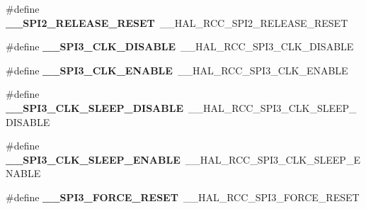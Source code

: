 \begin{DoxyCompactItemize}
\item 
\#define {\bfseries \+\_\+\+\_\+\+S\+P\+I2\+\_\+\+R\+E\+L\+E\+A\+S\+E\+\_\+\+R\+E\+S\+ET}~\+\_\+\+\_\+\+H\+A\+L\+\_\+\+R\+C\+C\+\_\+\+S\+P\+I2\+\_\+\+R\+E\+L\+E\+A\+S\+E\+\_\+\+R\+E\+S\+ET\hypertarget{group___h_a_l___r_c_c___aliased_ga92a086f3ba8dd0d3afe55ba477704051}{}\label{group___h_a_l___r_c_c___aliased_ga92a086f3ba8dd0d3afe55ba477704051}

\item 
\#define {\bfseries \+\_\+\+\_\+\+S\+P\+I3\+\_\+\+C\+L\+K\+\_\+\+D\+I\+S\+A\+B\+LE}~\+\_\+\+\_\+\+H\+A\+L\+\_\+\+R\+C\+C\+\_\+\+S\+P\+I3\+\_\+\+C\+L\+K\+\_\+\+D\+I\+S\+A\+B\+LE\hypertarget{group___h_a_l___r_c_c___aliased_ga28cdbd67b8d023f6c6d779ad764be780}{}\label{group___h_a_l___r_c_c___aliased_ga28cdbd67b8d023f6c6d779ad764be780}

\item 
\#define {\bfseries \+\_\+\+\_\+\+S\+P\+I3\+\_\+\+C\+L\+K\+\_\+\+E\+N\+A\+B\+LE}~\+\_\+\+\_\+\+H\+A\+L\+\_\+\+R\+C\+C\+\_\+\+S\+P\+I3\+\_\+\+C\+L\+K\+\_\+\+E\+N\+A\+B\+LE\hypertarget{group___h_a_l___r_c_c___aliased_gaa92d4898892ab4c0fba44fa0b6ac02b4}{}\label{group___h_a_l___r_c_c___aliased_gaa92d4898892ab4c0fba44fa0b6ac02b4}

\item 
\#define {\bfseries \+\_\+\+\_\+\+S\+P\+I3\+\_\+\+C\+L\+K\+\_\+\+S\+L\+E\+E\+P\+\_\+\+D\+I\+S\+A\+B\+LE}~\+\_\+\+\_\+\+H\+A\+L\+\_\+\+R\+C\+C\+\_\+\+S\+P\+I3\+\_\+\+C\+L\+K\+\_\+\+S\+L\+E\+E\+P\+\_\+\+D\+I\+S\+A\+B\+LE\hypertarget{group___h_a_l___r_c_c___aliased_ga7d9b001be65e2b904269e60f476643eb}{}\label{group___h_a_l___r_c_c___aliased_ga7d9b001be65e2b904269e60f476643eb}

\item 
\#define {\bfseries \+\_\+\+\_\+\+S\+P\+I3\+\_\+\+C\+L\+K\+\_\+\+S\+L\+E\+E\+P\+\_\+\+E\+N\+A\+B\+LE}~\+\_\+\+\_\+\+H\+A\+L\+\_\+\+R\+C\+C\+\_\+\+S\+P\+I3\+\_\+\+C\+L\+K\+\_\+\+S\+L\+E\+E\+P\+\_\+\+E\+N\+A\+B\+LE\hypertarget{group___h_a_l___r_c_c___aliased_gaef9852457424d2e92e6e1cb1366b8981}{}\label{group___h_a_l___r_c_c___aliased_gaef9852457424d2e92e6e1cb1366b8981}

\item 
\#define {\bfseries \+\_\+\+\_\+\+S\+P\+I3\+\_\+\+F\+O\+R\+C\+E\+\_\+\+R\+E\+S\+ET}~\+\_\+\+\_\+\+H\+A\+L\+\_\+\+R\+C\+C\+\_\+\+S\+P\+I3\+\_\+\+F\+O\+R\+C\+E\+\_\+\+R\+E\+S\+ET\hypertarget{group___h_a_l___r_c_c___aliased_ga5c8c0742752582b7b303fab8f23d1b3f}{}\label{group___h_a_l___r_c_c___aliased_ga5c8c0742752582b7b303fab8f23d1b3f}


\end{DoxyCompactItemize}
